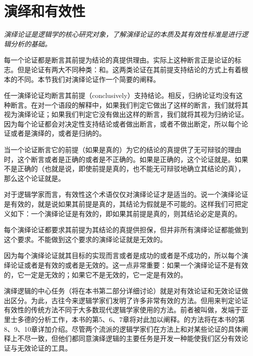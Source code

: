 \section{演绎和有效性}

\begin{logicbox}[title=引言]
\textit{演绎论证是逻辑学的核心研究对象，了解演绎论证的本质及其有效性标准是进行逻辑分析的基础。}
\end{logicbox}

每一个论证都是断言其前提为结论的真提供理由。实际上这种断言正是论证的标志。但是论证有两大不同种类：和。这两类论证在其前提支持结论的方式上有着根本的不同。本节我们对演绎论证作一个简要的阐释。

任一演绎论证均断言其前提（conclusively）支持结论。相反，归纳论证均没有这种断言。在对一个语段的解释中，如果我们判定它做出了这样的断言，我们就将其视为演绎论证；如果我们判定它没有做出这样的断言，我们就将其视为归纳论证。因为每个论证都会对决定性支持结论或者做出断言，或者不做出断定，所以每个论证或者是演绎的，或者是归纳的。

当一个论证断言它的前提（如果是真的）为它的结论的真提供了无可辩驳的理由时，这个断言或者是正确的或者是不正确的。如果是正确的，这个论证就是。如果不是正确的（也就是说，即使前提是真的，也不能无可辩驳地确立其结论的真），那么这个论证就是。

\begin{theorembox}[title=有效性定义]
对于逻辑学家而言，有效性这个术语仅仅对演绎论证才是适当的。说一个演绎论证是有效的，就是说如果其前提是真的，其结论为假就是不可能的。这样我们可把定义如下：一个演绎论证是有效的，即如果其前提是真的，则其结论必定是真的。
\end{theorembox}

每个演绎论证都要求其前提为其结论的真提供担保，但并非所有演绎论证都能做到这个要求。不能做到这个要求的演绎论证就是无效的。

因为每个演绎论证就其目标的实现而言或者是成功的或者是不成功的，所以每个演绎论证或者是有效的或者是无效的。这一点非常重要：如果一个演绎论证不是有效的，它一定是无效的；如果它不是无效的，它一定是有效的。

演绎逻辑的中心任务（将在本书第二部分详细讨论）就是对有效论证和无效论证做出区分。为此，古往今来逻辑学家们发明了许多非常有效的方法。但用来判定论证有效性的传统方法不同于大多数现代逻辑学家使用的方法。前者被叫做，发端于亚里士多德的分析工作，本书的第5、6、7章将对此加以阐释。的方法将在本书的第8、9、10章详加介绍。尽管两个流派的逻辑学家们在方法上和对某些论证的具体阐释上不尽一致，但他们都同意演绎逻辑的主要任务是开发一种能使我们区分有效论证与无效论证的工具。


